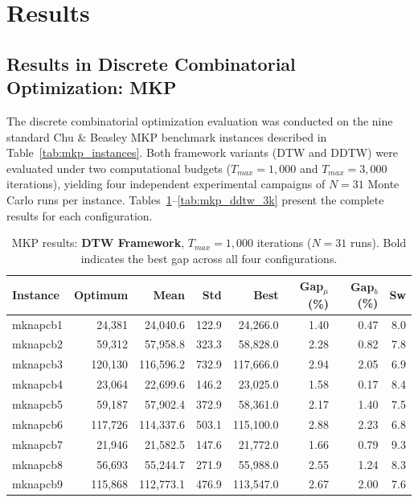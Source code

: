 \documentclass[review]{elsarticle}
\begin{document}
\section{Results}
\label{sec:results_and_discussion}



\subsection{Results in Discrete Combinatorial Optimization: MKP}
\label{sec:results_mkp}

The discrete combinatorial optimization evaluation was conducted on the nine standard Chu \& Beasley MKP benchmark instances described in Table~\ref{tab:mkp_instances}. Both framework variants (DTW and DDTW) were evaluated under two computational budgets ($T_{max} = 1{,}000$ and $T_{max} = 3{,}000$ iterations), yielding four independent experimental campaigns of $N = 31$ Monte Carlo runs per instance. Tables~\ref{tab:mkp_dtw_1k}--\ref{tab:mkp_ddtw_3k} present the complete results for each configuration.

\begin{table}[htbp]
\centering
\caption{MKP results: \textbf{DTW Framework}, $T_{max} = 1{,}000$ iterations ($N=31$ runs). Bold indicates the best gap across all four configurations.}
\label{tab:mkp_dtw_1k}
\begin{tabular}{lrrrrrrr}
\toprule
\textbf{Instance} & \textbf{Optimum} & \textbf{Mean} & \textbf{Std} & \textbf{Best} & \textbf{Gap$_\mu$ (\%)} & \textbf{Gap$_b$ (\%)} & \textbf{Sw} \\
\midrule
mknapcb1 & 24,381 & 24,040.6 & 122.9 & 24,266.0 & 1.40 & 0.47 & 8.0 \\
mknapcb2 & 59,312 & 57,958.8 & 323.3 & 58,828.0 & 2.28 & 0.82 & 7.8 \\
mknapcb3 & 120,130 & 116,596.2 & 732.9 & 117,666.0 & 2.94 & 2.05 & 6.9 \\
mknapcb4 & 23,064 & 22,699.6 & 146.2 & 23,025.0 & 1.58 & 0.17 & 8.4 \\
mknapcb5 & 59,187 & 57,902.4 & 372.9 & 58,361.0 & 2.17 & 1.40 & 7.5 \\
mknapcb6 & 117,726 & 114,337.6 & 503.1 & 115,100.0 & 2.88 & 2.23 & 6.8 \\
mknapcb7 & 21,946 & 21,582.5 & 147.6 & 21,772.0 & 1.66 & 0.79 & 9.3 \\
mknapcb8 & 56,693 & 55,244.7 & 271.9 & 55,988.0 & 2.55 & 1.24 & 8.3 \\
mknapcb9 & 115,868 & 112,773.1 & 476.9 & 113,547.0 & 2.67 & 2.00 & 7.6 \\
\bottomrule
\end{tabular}
\end{table}
\end{document}
